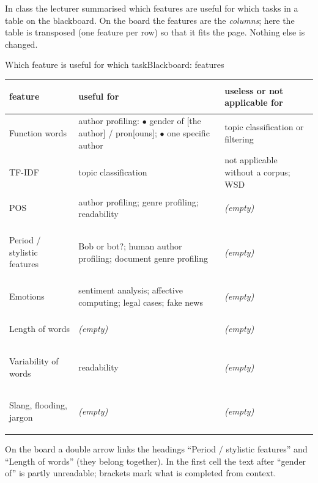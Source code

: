 In class the lecturer summarised which features are useful for which tasks in a table
on the blackboard. On the board the features are the \emph{columns}; here the table is
transposed (one feature per row) so that it fits the page. Nothing else is changed.

\begin{nbblackboard}{Which feature is useful for which task}{Blackboard: features}
\small
\renewcommand{\arraystretch}{1.25}
\begin{tabularx}{\linewidth}{@{}>{\bfseries\raggedright\arraybackslash}p{3.0cm}
  >{\raggedright\arraybackslash}X >{\raggedright\arraybackslash}p{4.0cm}@{}}
\toprule
\textnormal{\textbf{feature}} & \textbf{useful for} & \textbf{useless or not
  applicable for} \\
\midrule
Function words & author profiling: $\bullet$ gender of [the author] / pron[ouns];
  $\bullet$ one specific author & topic classification or filtering \\
TF-IDF & topic classification & not applicable without a corpus; WSD \\
POS & author profiling; genre profiling; readability & {\color{nbgray}\itshape(empty)} \\
Period / stylistic features & Bob or bot?; human author profiling; document genre
  profiling & {\color{nbgray}\itshape(empty)} \\
Emotions & sentiment analysis; affective computing; legal cases; fake news &
  {\color{nbgray}\itshape(empty)} \\
Length of words & {\color{nbgray}\itshape(empty)} & {\color{nbgray}\itshape(empty)} \\
Variability of words & readability & {\color{nbgray}\itshape(empty)} \\
Slang, flooding, jargon & {\color{nbgray}\itshape(empty)} &
  {\color{nbgray}\itshape(empty)} \\
\bottomrule
\end{tabularx}

\smallskip
{\color{nbgray}\scriptsize On the board a double arrow links the headings ``Period /
stylistic features'' and ``Length of words'' (they belong together). In the first cell
the text after ``gender of'' is partly unreadable; brackets mark what is completed from
context.}
\end{nbblackboard}

